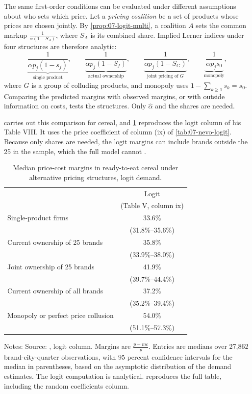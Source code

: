 The same first-order conditions can be evaluated under different assumptions about who sets which price. Let a
\emph{pricing coalition} be a set of products whose prices are chosen jointly. By \cref{prop:07-logit-multi}, a
coalition $A$ sets the common markup $\frac{1}{\alpha(1 - S_A)}$, where $S_A$ is its combined share. Implied Lerner
indices under four structures are therefore analytic:
\begin{equation}\label{eq:07-conduct-margins}
  \underbrace{\frac{1}{\alpha p_j(1 - s_j)}}_{\text{single product}}, \qquad
  \underbrace{\frac{1}{\alpha p_j(1 - S_f)}}_{\text{actual ownership}}, \qquad
  \underbrace{\frac{1}{\alpha p_j(1 - S_G)}}_{\text{joint pricing of } G}, \qquad
  \underbrace{\frac{1}{\alpha p_j s_0}}_{\text{monopoly}},
\end{equation}
where $G$ is a group of colluding products, and monopoly uses $1 - \sum_{k \ge 1}s_k = s_0$. Comparing the predicted
margins with observed margins, or with outside information on costs, tests the structures. Only $\hat\alpha$ and the
shares are needed.

\citet[Section~5.3]{Nevo2001} carries out this comparison for cereal, and \cref{tab:07-nevo-margins} reproduces the
logit column of his Table VIII. It uses the price coefficient of column (ix) of \cref{tab:07-nevo-logit}. Because only
shares are needed, the logit margins can include brands outside the 25 in the sample, which the full model cannot
\citep[pp.~332--333]{Nevo2001}.

\begin{table}[htbp]
\centering
\caption{Median price-cost margins in ready-to-eat cereal under alternative pricing structures, logit demand.}
\label{tab:07-nevo-margins}
\footnotesize
\begin{tabular}{lc}
\toprule
 & Logit \\
 & (Table V, column ix) \\
\midrule
Single-product firms & 33.6\% \\
 & (31.8\%--35.6\%) \\
Current ownership of 25 brands & 35.8\% \\
 & (33.9\%--38.0\%) \\
Joint ownership of 25 brands & 41.9\% \\
 & (39.7\%--44.4\%) \\
Current ownership of all brands & 37.2\% \\
 & (35.2\%--39.4\%) \\
Monopoly or perfect price collusion & 54.0\% \\
 & (51.1\%--57.3\%) \\
\bottomrule
\end{tabular}
\par\smallskip
\parbox{\linewidth}{\footnotesize Notes: Source: \citet[Table~VIII, p.~333]{Nevo2001}, logit column. Margins are
$\frac{p - mc}{p}$. Entries are medians over 27,862 brand-city-quarter observations, with 95 percent confidence
intervals for the median in parentheses, based on the asymptotic distribution of the demand estimates. The logit
computation is analytical.  reproduces the full table, including the random coefficients
column.}
\end{table}

